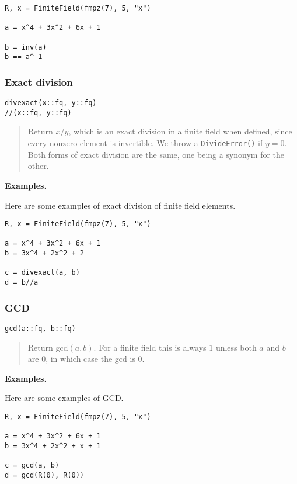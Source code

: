\documentclass[a4paper,10pt]{article}
\newcommand{\code}{\lstinline}
\newcommand{\desc}[1]{\vspace{-3mm}\begin{quote}#1\end{quote}}
\begin{document}
{{\begin{lstlisting}
R, x = FiniteField(fmpz(7), 5, "x")

a = x^4 + 3x^2 + 6x + 1

b = inv(a)
b == a^-1
\end{lstlisting}

\subsubsection{Exact division}

\begin{lstlisting}
divexact(x::fq, y::fq)
//(x::fq, y::fq)
\end{lstlisting}

\desc{Return $x/y$, which is an exact division in a finite field when defined,
since every nonzero element is invertible. We throw a \code{DivideError()} if
$y = 0$. Both forms of exact division are the same, one being a synonym for 
the other.}

\textbf{Examples.}

Here are some examples of exact division of finite field elements.

\begin{lstlisting}
R, x = FiniteField(fmpz(7), 5, "x")

a = x^4 + 3x^2 + 6x + 1
b = 3x^4 + 2x^2 + 2

c = divexact(a, b)
d = b//a
\end{lstlisting}

\subsubsection{GCD}

\begin{lstlisting}
gcd(a::fq, b::fq)
\end{lstlisting}

\desc{Return gcd$(a, b)$. For a finite field this is always $1$ unless both
$a$ and $b$ are $0$, in which case the gcd is $0$.}

\textbf{Examples.}

Here are some examples of GCD.

\begin{lstlisting}
R, x = FiniteField(fmpz(7), 5, "x")

a = x^4 + 3x^2 + 6x + 1
b = 3x^4 + 2x^2 + x + 1

c = gcd(a, b)
d = gcd(R(0), R(0))
\end{lstlisting}

}}
\end{document}
